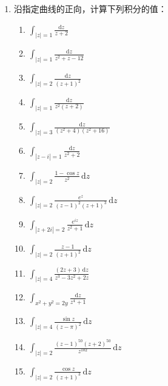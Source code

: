 \documentclass[openany,oneside]{ctexbook}
\begin{document}
\begin{enumerate}
\begin{enumerate}[label=\Alph*.]
\item 若 \(v(x,y)\) 是 \(u(x,y)\) 的共轭调和函数，则 \(u(x,y)\) 也是 \(v(x,y)\) 的共轭调和函数.
\item 若 \(u(x,y)\) 是区域 \(D\) 上的调和函数，则必存在在 \(u(x,y)\) 在区域 \(D\) 上的共轭调和函数.
\item 若 \(u(x,y)\) 和 \(v(x,y)\) 都是调和函数，则 \(u(x,y)+v(x,y)\) 是调和函数.
\item 若 \(u(x,y)\) 和 \(v(x,y)\) 都是调和函数，则 \(u(x,y)v(x,y)\) 是调和函数.
\end{enumerate}
\item 沿指定曲线的正向，计算下列积分的值：
\begin{enumerate}[label=(\arabic*), itemsep=1pt]
\item \(\displaystyle \int_{|z|=1} \frac{\mathrm{d}z}{z+2}\)
\item \(\displaystyle \int_{|z|=1} \frac{\mathrm{d}z}{z^2 + z - 12}\)
\item \(\displaystyle \int_{|z|=2} \frac{\mathrm{d}z}{(z+1)^2}\)
\item \(\displaystyle \int_{|z|=1} \frac{\mathrm{d}z}{z^2(z+2)}\)
\item \(\displaystyle \int_{|z|=3} \frac{\mathrm{d}z}{(z^2+4)(z^2+16)}\)
\item \(\displaystyle \int_{|z-i|=1} \frac{\mathrm{d}z}{z^2+2}\)
\item \(\displaystyle \int_{|z|=2} \frac{1-\cos z}{z^2} \, \mathrm{d}z\)
\item \(\displaystyle \int_{|z|=2} \frac{e^z}{(z-1)^2(z+1)^3} \, \mathrm{d}z\)
\item \(\displaystyle \int_{|z+2i|=2} \frac{e^{iz}}{z^2+1} \, \mathrm{d}z\)
\item \(\displaystyle \int_{|z|=2} \frac{z-1}{(z+1)^2} \, \mathrm{d}z\)
\item \(\displaystyle \int_{|z|=4} \frac{(2z+3) \, \mathrm{d}z}{z^3 - 3z^2 + 2z}\)
\item \(\displaystyle \int_{x^2+y^2=2y} \frac{\mathrm{d}z}{z^4+1}\)
\item \(\displaystyle \int_{|z|=4} \frac{\sin z}{(z-\pi)^2} \, \mathrm{d}z\)
\item \(\displaystyle \int_{|z|=2} \frac{(z-1)^{50}(z+2)^{50}}{z^{102}} \, \mathrm{d}z\)
\item \(\displaystyle \int_{|z|=2} \frac{\cos z}{(z+1)^3} \, \mathrm{d}z\)
\end{enumerate}


\end{enumerate}
\end{document}
